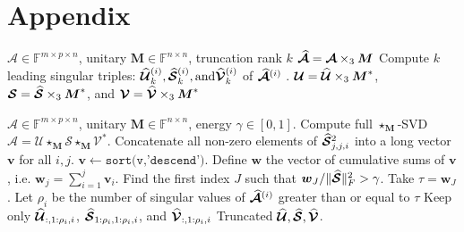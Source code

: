 \documentclass[11pt,letterpaper, onecolumn]{exam} %
\newcommand{\F}{\mathbb{F}}
\newcommand{\B}[1]{\boldsymbol{#1}}
\newcommand{\T}[1]{\boldsymbol{\mathcal{#1}}}
\newcommand{\Th}[1]{
\if A#1%
    \skew{7}\widehat{\boldsymbol{\mathcal{#1}}}%
  \else
    \if S#1%
      \skew{4}\widehat{\boldsymbol{\mathcal{#1}}}%
    \else
      \skew{2}\widehat{\boldsymbol{\mathcal{#1}}}%
    \fi
  \fi
}
\newcommand{\starM}{\star_{\B{M}}}
\begin{document}
\section*{Appendix}
\begin{algorithm}
\begin{algorithmic}[1]
\caption{\label{alg:tSVDMI}$\starM$-SVDI~\cite{kilmer2021tensor}.}
    \REQUIRE $\T{A}\in\F^{m\times p\times n}$, unitary $\B{M}\in \F^{n\times n}$, truncation rank $k$
    \STATE $\Th{A} =\T{A}\times_3\B{M} $
    \STATE Compute $k$ leading singular triples: $\Th{U}_k^{(i)}, \Th{S}_k^{(i)}, \text{and}\Th{V}_k^{(i)}$ of $\Th{A}^{(i)}$ .
    \ENDFOR
    \RETURN$\T{U} = \Th{U}\times_3 \B{M}^*$, $\T{S} = \Th{S}\times_3 \B{M}^*$, and $\T{V} = \Th{V}\times_3 \B{M}^*$ 
\end{algorithmic}
\end{algorithm}

\begin{algorithm}
\begin{algorithmic}[1]
    \caption{\label{alg:tSVDMII}$\starM$-SVDII (reproduced from Ref.~\cite{kilmer2021tensor}).}
    \REQUIRE $\T{A}\in\F^{m\times p\times n}$, unitary $\B{M}\in \F^{n\times n}$, energy $\gamma\in [0,1]$. 
    \STATE Compute full $\starM$-SVD  $\T{A} = \T{U}\starM\T{S}\starM\T{V}^* $. 
    \STATE Concatenate all non-zero elements of $\Th{S}_{j,j,i}^2$ into a long vector $\B{v}$ for all $i,j$.
    \STATE $\B{v} \gets \texttt{sort(v,'descend')}$. 
    \STATE Define $\B{w}$ the vector of cumulative sums of $\B{v}$, i.e. $\B{w}_j = \sum_{i=1}^j \B{v}_i$.  
    \STATE  Find the first index $J$ such that $\B{w}_J/\|\Th{S}\|_F^2 > \gamma$.
    \STATE Take $\tau = \B{w}_J$. 
        \STATE Let $\rho_i$ be the number of singular values of $\Th{A}^{(i)}$ greater than or equal to $\tau$
        \STATE Keep only $\Th{U}_{:,1:\rho_i,i}$, $\Th{S}_{1:\rho_i,1:\rho_i,i}$, and $\Th{V}_{:,1:\rho_i,i}$
    \ENDFOR
    \RETURN Truncated $\Th{U},\Th{S},\Th{V}$. 
\end{algorithmic}
\end{algorithm}



\end{document}

